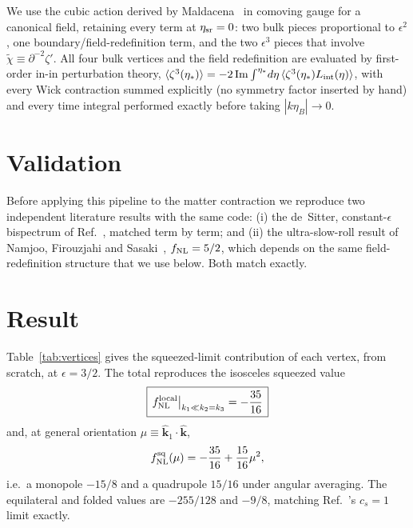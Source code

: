 \documentclass[aps,prd,reprint,superscriptaddress,showpacs,preprintnumbers,nofootinbib,longbibliography,floatfix]{revtex4-2}
\begin{document}
We use the cubic action derived by Maldacena~\cite{Maldacena:2002vr} in comoving gauge
for a canonical field, retaining every term at $\eta_{\rm sr}=0$: two bulk pieces
proportional to $\epsilon^2$, one boundary/field-redefinition term, and the two
$\epsilon^3$ pieces that involve $\tilde\chi\equiv\partial^{-2}\zeta'$. All four bulk
vertices and the field redefinition are evaluated by first-order in-in perturbation
theory, $\langle\zeta^3(\eta_*)\rangle=-2\,{\rm Im}\int^{\eta_*}\!d\eta\,\langle
\zeta^3(\eta_*)L_{\rm int}(\eta)\rangle$, with every Wick contraction summed explicitly
(no symmetry factor inserted by hand) and every time integral performed exactly before
taking $|k\eta_B|\to0$.

\section{Validation}

Before applying this pipeline to the matter contraction we reproduce two independent
literature results with the same code: (i) the de~Sitter, constant-$\epsilon$ bispectrum
of Ref.~\cite{Maldacena:2002vr}, matched term by term; and (ii) the ultra-slow-roll
result of Namjoo, Firouzjahi and Sasaki~\cite{Namjoo:2012}, $f_{\rm NL}=5/2$, which
depends on the same field-redefinition structure that we use below. Both match exactly.

\section{Result}

Table~\ref{tab:vertices} gives the squeezed-limit contribution of each vertex, from
scratch, at $\epsilon=3/2$. The total reproduces the isosceles squeezed value
\begin{equation}
\boxed{\,f_{\rm NL}^{\rm local}\big|_{k_1\ll k_2=k_3}=-\frac{35}{16}\,}
\end{equation}
and, at general orientation $\mu\equiv\hat{\mathbf k}_1\!\cdot\!\hat{\mathbf k}$,
\begin{equation}
f_{\rm NL}^{\rm sq}(\mu)=-\frac{35}{16}+\frac{15}{16}\mu^2,
\label{eq:orientation}
\end{equation}
i.e.\ a monopole $-15/8$ and a quadrupole $15/16$ under angular averaging. The
equilateral and folded values are $-255/128$ and $-9/8$, matching
Ref.~\cite{Li:2016}'s $c_s=1$ limit exactly.
\end{document}
